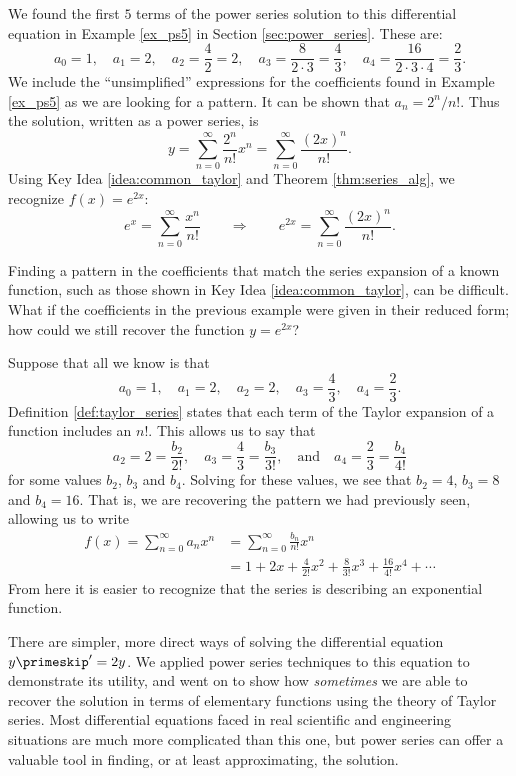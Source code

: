 \begin{solution}
{We found the first $ 5 $ terms of the power series solution to this differential equation in Example \ref{ex_ps5} in Section \ref{sec:power_series}. These are:
$$a_0=1,\quad a_1 = 2,\quad a_2 = \frac42=2,\quad a_3=\frac{8}{2\cdot3}=\frac43,\quad a_4=\frac{16}{2\cdot3\cdot4} = \frac23.$$
We include the ``unsimplified'' expressions for the coefficients found in Example \ref{ex_ps5} as we are looking for a pattern. It can be shown that $a_n = 2^n/n!$. Thus the solution, written as a power series, is
$$y = \sum_{n=0}^\infty \frac{2^n}{n!}x^n = \sum_{n=0}^\infty \frac{(2x)^n}{n!}.$$
Using Key Idea \ref{idea:common_taylor} and Theorem \ref{thm:series_alg}, we recognize $f(x) = e^{2x}$:
$$e^x = \sum_{n=0}^\infty \frac{x^n}{n!} \qquad \Rightarrow \qquad e^{2x} = \sum_{n=0}^\infty \frac{(2x)^n}{n!}.$$
}
\end{solution}





\clearpage

Finding a pattern in the coefficients that match the series expansion of a known function, such as those shown in Key Idea \ref{idea:common_taylor}, can be difficult. What if the coefficients in the previous example were given in their reduced form; how could we still recover the function $y=e^{2x}$?

Suppose that all we know is that 
$$a_0=1,\quad a_1=2,\quad a_2=2,\quad a_3=\frac43,\quad a_4=\frac23.$$
Definition \ref{def:taylor_series} states that each term of the Taylor expansion of a function includes an $n!$. This allows us to say that
$$a_2=2=\frac{b_2}{2!},\quad a_3 = \frac43=\frac{b_3}{3!},\quad \text{and}\quad a_4 = \frac23=\frac{b_4}{4!}$$
for some values $b_2$, $b_3$ and $b_4$.
Solving for these values, we see that $b_2=4$, $b_3 = 8$ and $b_4=16$. That is, we are recovering the pattern we had previously seen, allowing us to write 
\begin{align*}
f(x) = \sum_{n=0}^\infty a_nx^n &= \sum_{n=0}^\infty \frac{b_n}{n!}x^n \\
			&= 1+2x+ \frac{4}{2!}x^2 + \frac{8}{3!}x^3+\frac{16}{4!}x^4 + \cdots
\end{align*}
From here it is easier to recognize that the series is describing an exponential function.

There are simpler, more direct ways of solving the differential equation $y\primeskip' = 2y$. We applied power series techniques to this equation to demonstrate its utility, and went on to show how \emph{sometimes} we are able to recover the solution in terms of elementary functions using the theory of Taylor series. Most differential equations faced in real scientific and engineering situations are much more complicated than this one, but power series can offer a valuable tool in finding, or at least approximating, the solution.\\


